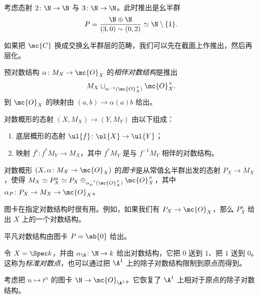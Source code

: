 \begin{exm}
    考虑态射 \(2 \colon \N \to \N\) 与 \(3 \colon \N \to \N\)。此时推出是幺半群
    \[ P = \frac{\N \oplus \N}{(3, 0) \sim (0,2)} \simeq \N \setminus \{1\}. \]
\end{exm}

如果把 \(\mc{C}\) 换成交换幺半群层的范畴，我们可以先在截面上作推出，然后再层化。

\begin{defn}
    预对数结构 \(\alpha \colon M_X \to \mc{O}_X\) 的\textit{相伴对数结构}是推出
    \[ M_X \sqcup_{\alpha^{-1}(\mc{O}_X^{\times})} \mc{O}_X^{\times}. \]
    到 \(\mc{O}_X\) 的映射由 \((a,b) \to \alpha(a) b\) 给出。
\end{defn}

\begin{defn}
    对数概形的态射 \((X, M_X) \to (Y, M_Y)\) 由以下组成：
    \begin{enumerate}
        \item 底层概形的态射 \(\ul{f} \colon \ul{X} \to \ul{Y}\)；
        \item 映射 \(f^{\flat} \colon f^* M_Y \to M_X\)，其中 \(f^* M_Y\) 是与 \(f^{-1} M_Y\) 相伴的对数结构。
    \end{enumerate}
\end{defn}

\begin{defn}
    对数概形 \((X, \alpha \colon M_X \to \mc{O}_X)\) 的\textit{图卡}是从常值幺半群出发的态射 \(P_X \to M_X\)，使得 \(M_X \simeq P_X^a \simeq P_X \oplus_{\alpha_P^{-1}(\mc{O}_X^{\times})} \mc{O}_X^{\times}\)，其中 \(\alpha_P \colon P_X \to M_X \to \mc{O}_X\)。
\end{defn}

图卡在指定对数结构时很有用。例如，如果我们有 \(P_X \to \mc{O}_X\)，那么 \(P_X^a\) 给出 \(X\) 上的一个对数结构。

\begin{exm}
    平凡对数结构由图卡 \(P = \ab\{0\}\) 给出。
\end{exm}

\begin{exm}
    令 \(X = \Spec k\)，并由 \(\alpha_{\N} \colon \N \to k\) 给出对数结构，它把 \(0\) 送到 \(1\)、把 \(1\) 送到 \(0\)。这称为\textit{标准对数点}，也可以通过把 \(\A^1\) 上的除子对数结构限制到原点而得到。
\end{exm}

\begin{exm}
    考虑把 \(n \mapsto t^n\) 的图卡 \(\N \to \mc{O}_{\A^1}\)。它恢复了 \(\A^1\) 上相对于原点的除子对数结构。
\end{exm}

